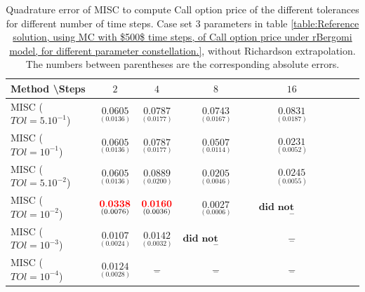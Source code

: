 \documentclass[11pt]{article}
\begin{document}
\begin{table}[h!]
	\centering
	\begin{tabular}{l*{6}{c}r}
		Method \textbackslash  Steps            & $2$ & $4$ & $8$ & $16$  \\
		\hline
		MISC ($TOl=5.10^{-1}$)  & $\underset{( 0.0136)}{\mathbf{ 0.0605}}$ & $\underset{(0.0177)}{\mathbf{0.0787}}$ & $\underset{( 0.0167
			)}{\mathbf{   0.0743
		}}$ & $\underset{(0.0187)}{\mathbf{ 0.0831}}$  \\
		MISC ($TOl=10^{-1}$)  & $\underset{( 0.0136)}{\mathbf{ 0.0605}}$ & $\underset{(0.0177)}{\mathbf{0.0787}}$ & $\underset{(0.0114)}{\mathbf{ 0.0507}}$ & $\underset{(  0.0052)}{\mathbf{0.0231}}$  \\
		MISC ($TOl=5.10^{-2}$)  &$\underset{( 0.0136)}{\mathbf{ 0.0605}}$ & $\underset{( 0.0200
			)}{\mathbf{
				0.0889}}$ & $\underset{(  0.0046)}{\mathbf{
				0.0205
		}}$ & $\underset{(0.0055)}{\mathbf{  0.0245}}$  \\
		MISC ($TOl=10^{-2}$)  & $\underset{(0.0076)}{\mathbf{ {\color{red}0.0338}}}$ & $\underset{(0.0036)}{\mathbf{   {\color{red}{\color{red}0.0160}}}}$ & $\underset{(0.0006)}{\mathbf{0.0027}}$ & $\underset{-}{\mathbf{\text{did not converge}}}$  \\
		MISC ($TOl=10^{-3}$)  & $\underset{(  0.0024
			)}{\mathbf{ 0.0107}}$ & $\underset{(  0.0032)}{\mathbf{
				0.0142
		}}$ & $\underset{-}{\mathbf{\text{did not converge}}}$ & $\underset{-}{\mathbf{-}}$  \\
		MISC ($TOl=10^{-4}$)  & $\underset{(   0.0028
			)}{\mathbf{   0.0124
		}}$ & $\underset{-}{\mathbf{-}}$ & $\underset{-}{\mathbf{-}}$ & $\underset{-}{\mathbf{-}}$  \\
		\hline
	\end{tabular}
	\caption{Quadrature error of MISC to compute Call option price of the different tolerances for different number of time steps. Case  set $3$ parameters in table \ref{table:Reference solution, using MC with $500$ time steps, of Call option price under rBergomi model, for different parameter constellation.}, without Richardson extrapolation. The numbers between parentheses are the corresponding absolute errors.}
	\label{Quadrature error of MISC to compute Call option price of the different tolerances for different number of time steps. Case  set $3$ parameters, without Richardson extrapolation. The numbers between parentheses are the corresponding absolute errors.}
\end{table}
\end{document}

